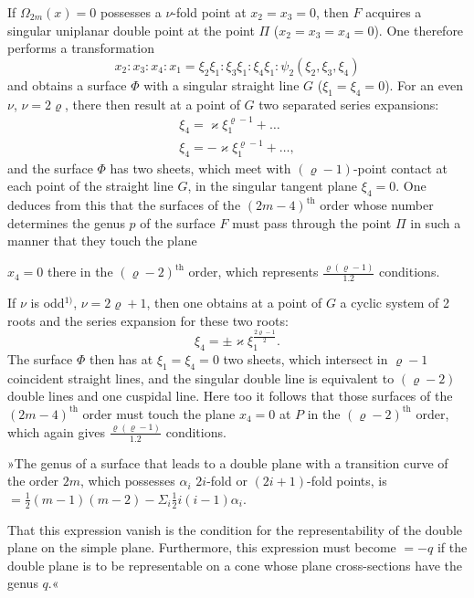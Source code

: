 \documentclass{article}
\begin{document}
If $\varOmega_{2m}(x) = 0$ possesses a $\nu$-fold point at $x_2 = x_3 = 0$, then $F$ acquires a singular uniplanar double point at the point $\varPi$ ($x_2 = x_3 = x_4 = 0$). One therefore performs a transformation
\[ x_2 : x_3 : x_4 : x_1 = \xi_2 \xi_1 : \xi_3 \xi_1 : \xi_4 \xi_1 : \psi_2(\xi_2, \xi_3, \xi_4) \]
and obtains a surface $\varPhi$ with a singular straight line $G$ ($\xi_1 = \xi_4 = 0$). For an even $\nu$, $\nu = 2\varrho$, there then result at a point of $G$ two separated series expansions:
\[
\begin{gathered}
\xi_4 = \varkappa \xi_1^{\varrho-1} + \ldots \\
\xi_4 = -\varkappa \xi_1^{\varrho-1} + \ldots,
\end{gathered}
\]
and the surface $\varPhi$ has two sheets, which meet with $(\varrho-1)$-point contact at each point of the straight line $G$, in the singular tangent plane $\xi_4 = 0$. One deduces from this that the surfaces of the $(2m-4)^{\text{th}}$ order whose number determines the genus $p$ of the surface $F$ must pass through the point $\varPi$ in such a manner that they touch the plane

$x_4 = 0$ there in the $(\varrho-2)^{\text{th}}$ order, which represents $\frac{\varrho(\varrho-1)}{1.2}$ conditions.

If $\nu$ is odd${}^{1)}$, $\nu = 2\varrho+1$, then one obtains at a point of $G$ a cyclic system of 2 roots and the series expansion for these two roots:
\[ \xi_4 = \pm \varkappa \xi_1^{\frac{2\varrho-1}{2}}. \]
The surface $\varPhi$ then has at $\xi_1 = \xi_4 = 0$ two sheets, which intersect in $\varrho-1$ coincident straight lines, and the singular double line is equivalent to $(\varrho-2)$ double lines and one cuspidal line. Here too it follows that those surfaces of the $(2m-4)^{\text{th}}$ order must touch the plane $x_4 = 0$ at $P$ in the $(\varrho-2)^{\text{th}}$ order, which again gives $\frac{\varrho(\varrho-1)}{1.2}$ conditions.

»The genus of a surface that leads to a double plane with a transition curve of the order $2m$, which possesses $\alpha_i$ $2i$-fold or $(2i+1)$-fold points, is $=\frac{1}{2}(m-1)(m-2) - \Sigma_i \frac{1}{2} i(i-1)\alpha_i$.

That this expression vanish is the condition for the representability of the double plane on the simple plane. Furthermore, this expression must become $=-q$ if the double plane is to be representable on a cone whose plane cross-sections have the genus $q$.«
\end{document}
